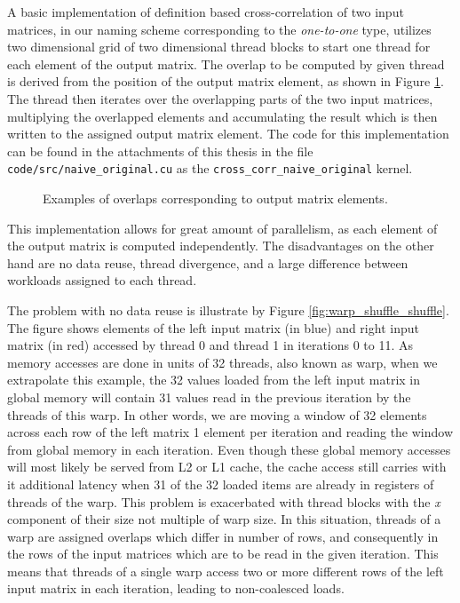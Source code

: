 A basic implementation of definition based cross-correlation of two input matrices, in our naming scheme corresponding to the \textit{one-to-one} type, utilizes two dimensional grid of two dimensional thread blocks to start one thread for each element of the output matrix. The overlap to be computed by given thread is derived from the position of the output matrix element, as shown in Figure \ref{fig:basic_algorithm_overlaps}. The thread then iterates over the overlapping parts of the two input matrices, multiplying the overlapped elements and accumulating the result which is then written to the assigned output matrix element. The code for this implementation can be found in the attachments of this thesis in the file \texttt{code/src/naive\_original.cu} as the \texttt{cross\_corr\_naive\_original} kernel.

\begin{figure}[ht]
	\fontsize{6}{8}\selectfont
	\centering
	\def\svgwidth{0.55\textwidth}
	
	\caption{Examples of overlaps corresponding to output matrix elements.}
	\label{fig:basic_algorithm_overlaps}
\end{figure}

This implementation allows for great amount of parallelism, as each element of the output matrix is computed independently.
The disadvantages on the other hand are no data reuse, thread divergence, and a large difference between workloads assigned to each thread.


The problem with no data reuse is illustrate by Figure \ref{fig:warp_shuffle_shuffle}. The figure shows elements of the left input matrix (in blue) and right input matrix (in red) accessed by thread 0 and thread 1 in iterations 0 to 11. As memory accesses are done in units of 32 threads, also known as warp, when we extrapolate this example, the 32 values loaded from the left input matrix in global memory will contain 31 values read in the previous iteration by the threads of this warp. In other words, we are moving a window of 32 elements across each row of the left matrix 1 element per iteration and reading the window from global memory in each iteration. Even though these global memory accesses will most likely be served from L2 or L1 cache, the cache access still carries  with it additional latency when 31 of the 32 loaded items are already in registers of threads of the warp.
This problem is exacerbated with thread blocks with the \textit{x} component of their size not multiple of warp size. In this situation, threads of a warp are assigned overlaps which differ in number of rows, and consequently in the rows of the input matrices which are to be read in the given iteration. This means that threads of a single warp access two or more different rows of the left input matrix in each iteration, leading to non-coalesced loads.

